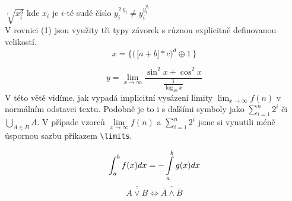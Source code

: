 \documentclass[a4paper, 11pt, twocolumn]{article}
\theoremstyle{definition}
\theoremstyle{definition}
\begin{document}
\quad $\sqrt[i]{x_i^3}$ kde $x_i$ je $i$-té sudé číslo \quad $y_i^{2.y_i}\neq y_i^{y_i^{y_i}}$\\


V rovnici (1) jsou využity tři typy závorek s různou explicitně definovanou velikostí.
\begin{equation}
x =\bigg\{\Big( \,\big[a + b\big] * c\Big)^d \oplus 1 \,\bigg\} \label{rovnice_1}
\end{equation}

$$
y = \lim_{x\to\infty} \frac{\sin^2 x + \cos^2x}{\frac{1}{\log_{10}{x}}}
$$
V této větě vidíme, jak vypadá implicitní vysázení limity $\lim_{x\to\infty} f(n)$ v normálním odstavci textu. Podobně je to i s dalšími symboly jako $\sum_{i=1}^{n} 2^{i}$ či $\bigcup_{A\in B} A$. V případe vzorců $\lim\limits_{x\to\infty} f(n)$ a $\sum\limits_{i=1}^{n} 2^{i}$ jsme si vynutili méně úspornou sazbu příkazem \verb|\limits|.

\begin{equation}
\int_{a}^{b} f(x)dx = -\int\displaylimits_{a}^{b} g(x)dx
\label{rovnice_2}
\end{equation}
\begin{equation}
\overline{\overline{ A\lor B}} \Leftrightarrow \overline{\overline{A} \land \overline{B}}
\label{rovnice_3}
\end{equation}
\end{document}

